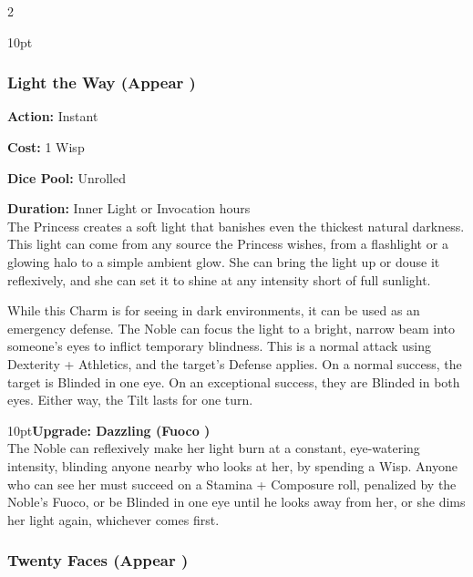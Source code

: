 \begin{multicols}{2}
\begin{myindentpar}{10pt}
\end{myindentpar}


\subsubsection*{Light the Way (Appear \textbullet)}

\noindent \textbf{Action:} Instant 

\noindent \textbf{Cost:} 1 Wisp 

\noindent \textbf{Dice Pool:} Unrolled 

\noindent \textbf{Duration:} Inner Light or Invocation hours \\

\noindent The Princess creates a soft light that banishes even the thickest natural darkness. This light can come from any source the Princess wishes, from a flashlight or a glowing halo to a simple ambient glow. She can bring the light up or douse it reflexively, and she can set it to shine at any intensity short of full sunlight.

While this Charm is for seeing in dark environments, it can be used as an emergency defense. The Noble can focus the light to a bright, narrow beam into someone’s eyes to inflict temporary blindness. This is a normal attack using Dexterity + Athletics, and the target’s Defense applies. On a normal success, the target is Blinded in one eye. On an exceptional success, they are Blinded in both eyes. Either way, the Tilt lasts for one turn.

\begin{myindentpar}{10pt}\textbf{Upgrade: Dazzling (Fuoco \textbullet)}\\

\noindent The Noble can reflexively make her light burn at a constant, eye-watering intensity, blinding anyone nearby who looks at her, by spending a Wisp. Anyone who can see her must succeed on a Stamina + Composure roll, penalized by the Noble’s Fuoco, or be Blinded in one eye until he looks away from her, or she dims her light again, whichever comes first.\end{myindentpar}

\subsubsection*{Twenty Faces (Appear \textbullet)}


\end{multicols}
